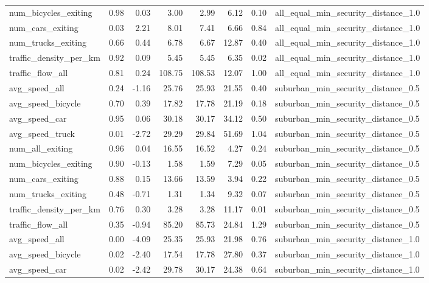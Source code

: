 \begin{table}[ht]
\begin{tabular}{lrrrrrrl}
  num\_bicycles\_exiting & 0.98 & 0.03 & 3.00 & 2.99 & 6.12 & 0.10 & all\_equal\_min\_security\_distance\_1.0 \\ 
  num\_cars\_exiting & 0.03 & 2.21 & 8.01 & 7.41 & 6.66 & 0.84 & all\_equal\_min\_security\_distance\_1.0 \\ 
  num\_trucks\_exiting & 0.66 & 0.44 & 6.78 & 6.67 & 12.87 & 0.40 & all\_equal\_min\_security\_distance\_1.0 \\ 
  traffic\_density\_per\_km & 0.92 & 0.09 & 5.45 & 5.45 & 6.35 & 0.02 & all\_equal\_min\_security\_distance\_1.0 \\ 
  traffic\_flow\_all & 0.81 & 0.24 & 108.75 & 108.53 & 12.07 & 1.00 & all\_equal\_min\_security\_distance\_1.0 \\ 
  avg\_speed\_all & 0.24 & -1.16 & 25.76 & 25.93 & 21.55 & 0.40 & suburban\_min\_security\_distance\_0.5 \\ 
  avg\_speed\_bicycle & 0.70 & 0.39 & 17.82 & 17.78 & 21.19 & 0.18 & suburban\_min\_security\_distance\_0.5 \\ 
  avg\_speed\_car & 0.95 & 0.06 & 30.18 & 30.17 & 34.12 & 0.50 & suburban\_min\_security\_distance\_0.5 \\ 
  avg\_speed\_truck & 0.01 & -2.72 & 29.29 & 29.84 & 51.69 & 1.04 & suburban\_min\_security\_distance\_0.5 \\ 
  num\_all\_exiting & 0.96 & 0.04 & 16.55 & 16.52 & 4.27 & 0.24 & suburban\_min\_security\_distance\_0.5 \\ 
  num\_bicycles\_exiting & 0.90 & -0.13 & 1.58 & 1.59 & 7.29 & 0.05 & suburban\_min\_security\_distance\_0.5 \\ 
  num\_cars\_exiting & 0.88 & 0.15 & 13.66 & 13.59 & 3.94 & 0.22 & suburban\_min\_security\_distance\_0.5 \\ 
  num\_trucks\_exiting & 0.48 & -0.71 & 1.31 & 1.34 & 9.32 & 0.07 & suburban\_min\_security\_distance\_0.5 \\ 
  traffic\_density\_per\_km & 0.76 & 0.30 & 3.28 & 3.28 & 11.17 & 0.01 & suburban\_min\_security\_distance\_0.5 \\ 
  traffic\_flow\_all & 0.35 & -0.94 & 85.20 & 85.73 & 24.84 & 1.29 & suburban\_min\_security\_distance\_0.5 \\ 
  avg\_speed\_all & 0.00 & -4.09 & 25.35 & 25.93 & 21.98 & 0.76 & suburban\_min\_security\_distance\_1.0 \\ 
  avg\_speed\_bicycle & 0.02 & -2.40 & 17.54 & 17.78 & 27.80 & 0.37 & suburban\_min\_security\_distance\_1.0 \\ 
  avg\_speed\_car & 0.02 & -2.42 & 29.78 & 30.17 & 24.38 & 0.64 & suburban\_min\_security\_distance\_1.0 \\ 

\end{tabular}
\end{table}
